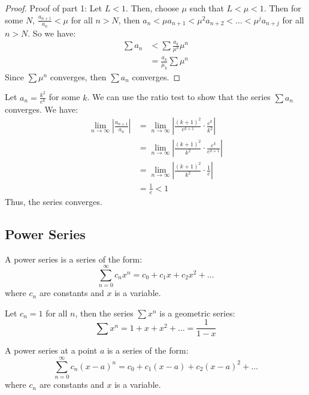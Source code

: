 \documentclass[11pt]{report}
\begin{document}
\begin{proof}
    Proof of part 1: Let $L < 1$. Then, choose $\mu$ such that $L < \mu < 1$. Then for some $N$, $ \frac{a_{n+1}}{a_n}  < \mu$ for all $n > N$, then $a_{n} < \mu a_{n+1} < \mu^2 a_{n+2} < \ldots < \mu^j a_{n+j}$ for all $n > N$. So we have:
    \begin{align*}
        \sum a_n &< \sum \frac{a_k}{\mu^k} \mu^n \\
        &= \frac{a_k}{\mu_k} \sum \mu^n
    \end{align*}
    Since $\sum \mu^n$ converges, then $\sum a_n$ converges.
\end{proof}
\begin{example}
    Let $a_n = \frac{k^2}{e^k}$ for some $k$. We can use the ratio test to show that the series $\sum a_n$ converges. We have:
    \begin{align*}
        \lim_{n \to \infty} \left | \frac{a_{n+1}}{a_n} \right | &= \lim_{n \to \infty} \left | \frac{(k+1)^2}{e^{k+1}} \cdot \frac{e^k}{k^2} \right | \\
        &= \lim_{n \to \infty} \left | \frac{(k+1)^2}{k^2} \cdot \frac{e^k}{e^{k+1}} \right | \\
        &= \lim_{n \to \infty} \left | \frac{(k+1)^2}{k^2} \cdot \frac{1}{e} \right | \\
        &= \frac{1}{e} < 1
    \end{align*}
    Thus, the series converges.
\end{example}
\subsection{Power Series}
\begin{definition}
    A power series is a series of the form:
    \begin{equation}
        \sum_{n=0}^{\infty} c_n x^n = c_0 + c_1x + c_2x^2 + \ldots
    \end{equation}
    where $c_n$ are constants and $x$ is a variable. 
\end{definition}
\begin{example}
    Let $c_n = 1$ for all $n$, then the series $\sum x^n$ is a geometric series:
    \begin{equation*}
        \sum x^n = 1 + x + x^2 + \ldots = \frac{1}{1-x}
    \end{equation*}
\end{example}
\begin{definition}
    A power series at a point $a$ is a series of the form:
    \begin{equation}
        \sum_{n=0}^{\infty} c_n (x-a)^n = c_0 + c_1(x-a) + c_2(x-a)^2 + \ldots
    \end{equation}
    where $c_n$ are constants and $x$ is a variable.
\end{definition}
\end{document}

